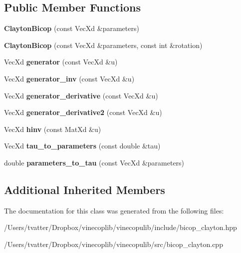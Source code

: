 \subsection*{Public Member Functions}
\begin{DoxyCompactItemize}
\item 
\mbox{\label{class_clayton_bicop_a40ae835970aa67c3aacea800a831cc52}} 
{\bfseries Clayton\+Bicop} (const Vec\+Xd \&parameters)
\item 
\mbox{\label{class_clayton_bicop_a7b28e2ac34943f2b69616efffedcf720}} 
{\bfseries Clayton\+Bicop} (const Vec\+Xd \&parameters, const int \&rotation)
\item 
\mbox{\label{class_clayton_bicop_a9763aabca37806261b8ecd6c46f4cf95}} 
Vec\+Xd {\bfseries generator} (const Vec\+Xd \&u)
\item 
\mbox{\label{class_clayton_bicop_a295caa6493575640a96201414dbf398f}} 
Vec\+Xd {\bfseries generator\+\_\+inv} (const Vec\+Xd \&u)
\item 
\mbox{\label{class_clayton_bicop_ab009f6aa6036ad92d83a3d185e6234d8}} 
Vec\+Xd {\bfseries generator\+\_\+derivative} (const Vec\+Xd \&u)
\item 
\mbox{\label{class_clayton_bicop_af24c631fbf12bcf3f52724fcf926cfef}} 
Vec\+Xd {\bfseries generator\+\_\+derivative2} (const Vec\+Xd \&u)
\item 
\mbox{\label{class_clayton_bicop_a3de44e26cffcac6d7e2511cc1ad56b04}} 
Vec\+Xd {\bfseries hinv} (const Mat\+Xd \&u)
\item 
\mbox{\label{class_clayton_bicop_a7ffb38cb5802a8d4d45f401ac5aab83b}} 
Vec\+Xd {\bfseries tau\+\_\+to\+\_\+parameters} (const double \&tau)
\item 
\mbox{\label{class_clayton_bicop_a5eba5ab351ad17df7d633c7c96f6cbdf}} 
double {\bfseries parameters\+\_\+to\+\_\+tau} (const Vec\+Xd \&parameters)
\end{DoxyCompactItemize}
\subsection*{Additional Inherited Members}


The documentation for this class was generated from the following files\+:\begin{DoxyCompactItemize}
\item 
/\+Users/tvatter/\+Dropbox/vinecoplib/vinecopulib/include/bicop\+\_\+clayton.\+hpp\item 
/\+Users/tvatter/\+Dropbox/vinecoplib/vinecopulib/src/bicop\+\_\+clayton.\+cpp\end{DoxyCompactItemize}
